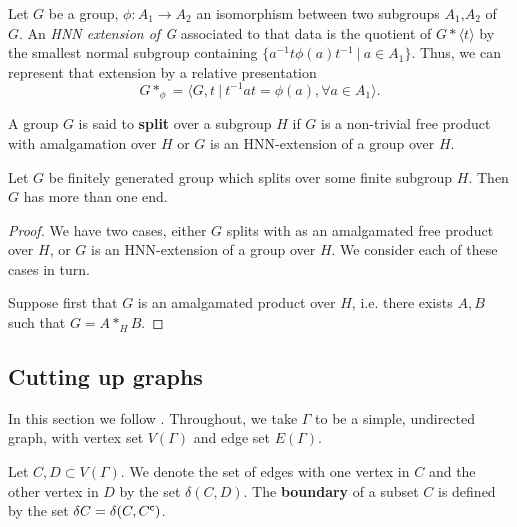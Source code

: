  \begin{definition}
     Let $G$ be a group, $\phi: A_1 \to A_2$ an isomorphism between two subgroups $A_1$,$A_2$ of $G$. An \emph{HNN extension of G} associated to that data is the quotient of $G \ast \langle t \rangle$ by the smallest normal subgroup containing $\{a^{-1}t\phi(a)t^{-1} \: | \: a \in A_1 \}$. Thus, we can represent that extension by a relative presentation 
    \[G \ast_\phi = \langle G,t \: | \: t^{-1}at = \phi(a), \forall a \in A_1 \rangle. \]
 \end{definition}

\begin{definition}[Splitting]
    A group \(G\) is said to \textbf{split} over a subgroup \(H\) if \(G\) is a non-trivial free product with amalgamation over \(H\) or \(G\) is an HNN-extension of a group over \(H\). 
\end{definition}

\begin{theorem}
    Let \(G\) be finitely generated group which splits over some finite subgroup \(H\). Then \(G\) has more than one end.
\end{theorem}

\begin{proof}
    We have two cases, either \(G\) splits with as an amalgamated free product over \(H\), or \(G\) is an HNN-extension of a group over \(H\). We consider each of these cases in turn.

    Suppose first that \(G\) is an amalgamated product over \(H\), i.e. there exists \(A,B\) such that \(G = A *_H B\).

\end{proof}

\subsection{Cutting up graphs}

In this section we follow \cite{K10}. Throughout, we take \(\Gamma\) to be a simple, undirected graph, with vertex set \(V(\Gamma)\) and edge set \(E(\Gamma)\).

\begin{definition}
    Let \(C,D \subset V(\Gamma)\). We denote the set of edges with one vertex in \(C\) and the other vertex in \(D\) by the set \(\delta(C,D)\). The \textbf{boundary} of a subset \(C\) is defined by the set \(\delta C = \delta(C, {C}^{\mathsf{c}})\).
\end{definition}

